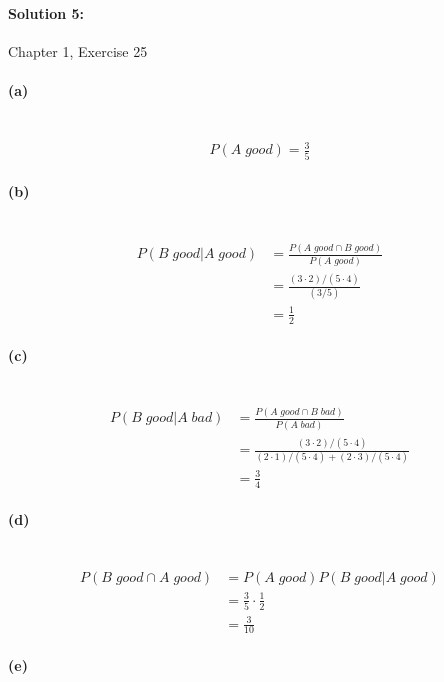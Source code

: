 \documentclass[a4paper]{article}
\begin{document}
\paragraph{Solution 5:}
Chapter 1, Exercise 25

\paragraph{(a)} ~\\
\begin{align*}
P(A \; good) = \frac{3}{5}
\end{align*}

\paragraph{(b)} ~\\
\begin{align*}
P(B \; good | A \; good) &= \frac{P(A \; good \cap B \; good)}{P(A \; good)} \\
                         &= \frac{(3 \cdot 2)/(5 \cdot 4)}{(3 / 5)} \\
                         &= \frac{1}{2}
\end{align*}

\paragraph{(c)} ~\\
\begin{align*}
P(B \; good | A \; bad) &= \frac{P(A \; good \cap B \; bad)}{P(A \; bad)} \\
                        &= \frac{(3 \cdot 2)/(5 \cdot 4)}{(2 \cdot 1)/(5 \cdot 4) + (2 \cdot 3)/(5 \cdot 4)} \\
                        &= \frac{3}{4}
\end{align*}

\paragraph{(d)} ~\\
\begin{align*}
P(B \; good \cap A \; good) &= P(A \; good) P(B \; good | A \; good) \\
                            &= \frac{3}{5} \cdot \frac{1}{2} \\
                            &= \frac{3}{10}
\end{align*}

\paragraph{(e)} ~\\
\end{document}
